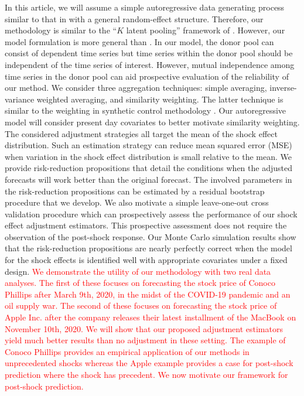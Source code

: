 \documentclass[11pt,3p,review,authoryear]{elsarticle}
\theoremstyle{definition}
\begin{document}
In this article, we will assume a simple autoregressive data generating process similar to that in \citet{blundell1998initial} with a general random-effect structure. Therefore, our methodology is similar to the ``$K$ latent pooling'' framework of \cite{ramaswamy1993empirical}. However, our model formulation is more general than \cite{ramaswamy1993empirical}. In our model, the donor pool can consist of dependent time series but time series within the donor pool should be independent of the time series of interest. However, mutual independence among time series in the donor pool can aid prospective evaluation of the reliability of our method. We consider three aggregation techniques: simple averaging, inverse-variance weighted averaging, and similarity weighting. The latter technique is similar to the weighting in synthetic control methodology \citep{abadie2010synthetic}. Our autoregressive model will consider present day covariates to better motivate similarity weighting. The considered adjustment strategies all target the mean of the shock effect distribution. Such an estimation strategy can reduce mean squared error (MSE) when variation in the shock effect distribution is small relative to the mean. We provide risk-reduction propositions that detail the conditions when the adjusted forecasts will work better than the original forecast. The involved parameters in the risk-reduction propositions can be estimated by a residual bootstrap procedure that we develop. We also motivate a simple leave-one-out cross validation procedure which can prospectively assess the performance of our shock effect adjustment estimators. This prospective assessment does not require the observation of the post-shock response. Our Monte Carlo simulation results show that the risk-reduction propositions are nearly perfectly correct when the model for the shock effects is identified well with appropriate covariates under a fixed design.  \textcolor{red}{We demonstrate the utility of our methodology with two real data analyses. The first of these focuses on forecasting the stock price of Conoco Phillips after March 9th, 2020, in the midst of the COVID-19 pandemic and an oil supply war. The second of these focuses on forecasting the stock price of Apple Inc. after the company releases their latest installment of the MacBook on November 10th, 2020. We will show that our proposed adjustment estimators yield much better results than no adjustment in these setting. The example of Conoco Phillips provides an empirical application of our methods in unprecedented shocks whereas the Apple example provides a case for post-shock prediction where the shock has precedent. We now motivate our framework for post-shock prediction.}
\end{document}
